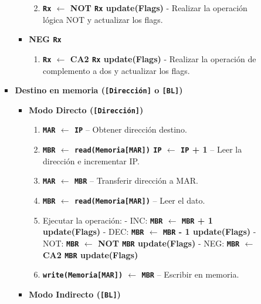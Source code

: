 \documentclass[12pt,oneside]{templates/unerthesis}
\providecommand{\tightlist}{%
  \setlength{\itemsep}{0pt}\setlength{\parskip}{0pt}}
\begin{document}
\begin{itemize}
\begin{itemize}
\begin{itemize}
\begin{itemize}
        \begin{enumerate}
        \def\labelenumi{\arabic{enumi}.}
        \setcounter{enumi}{3}
        \tightlist
        \item
          \textbf{\texttt{Rx} \(\leftarrow\) NOT \texttt{Rx} \textbar{} update(Flags)} - Realizar la operación lógica NOT y actualizar los flags.
        \end{enumerate}
      \item
        \textbf{NEG \texttt{Rx}}

        \begin{enumerate}
        \def\labelenumi{\arabic{enumi}.}
        \setcounter{enumi}{3}
        \tightlist
        \item
          \textbf{\texttt{Rx} \(\leftarrow\) CA2 \texttt{Rx} \textbar{} update(Flags)} - Realizar la operación de complemento a dos y actualizar los flags.
        \end{enumerate}
      \end{itemize}
    \item
      \textbf{Destino en memoria (\texttt{{[}Dirección{]}} o \texttt{{[}BL{]}})}

      \begin{itemize}
      \tightlist
      \item
        \textbf{Modo Directo (\texttt{{[}Dirección{]}})}

        \begin{enumerate}
        \def\labelenumi{\arabic{enumi}.}
        \setcounter{enumi}{3}
        \tightlist
        \item
          \textbf{\texttt{MAR} \(\leftarrow\) \texttt{IP}} -- Obtener dirección destino.
        \item
          \textbf{\texttt{MBR} \(\leftarrow\) \texttt{read(Memoria{[}MAR{]})} \textbar{} \texttt{IP} \(\leftarrow\) \texttt{IP} + 1} -- Leer la dirección e incrementar IP.
        \item
          \textbf{\texttt{MAR} \(\leftarrow\) \texttt{MBR}} -- Transferir dirección a MAR.
        \item
          \textbf{\texttt{MBR} \(\leftarrow\) \texttt{read(Memoria{[}MAR{]})}} -- Leer el dato.
        \item
          Ejecutar la operación:
          - INC: \textbf{\texttt{MBR} \(\leftarrow\) \texttt{MBR} + 1 \textbar{} update(Flags)}
          - DEC: \textbf{\texttt{MBR} \(\leftarrow\) \texttt{MBR} - 1 \textbar{} update(Flags)}
          - NOT: \textbf{\texttt{MBR} \(\leftarrow\) NOT \texttt{MBR} \textbar{} update(Flags)}
          - NEG: \textbf{\texttt{MBR} \(\leftarrow\) CA2 \texttt{MBR} \textbar{} update(Flags)}
        \item
          \textbf{\texttt{write(Memoria{[}MAR{]})} \(\leftarrow\) \texttt{MBR}} -- Escribir en memoria.
        \end{enumerate}
      \item
        \textbf{Modo Indirecto (\texttt{{[}BL{]}})}


\end{itemize}
\end{itemize}
\end{itemize}
\end{itemize}
\end{document}

